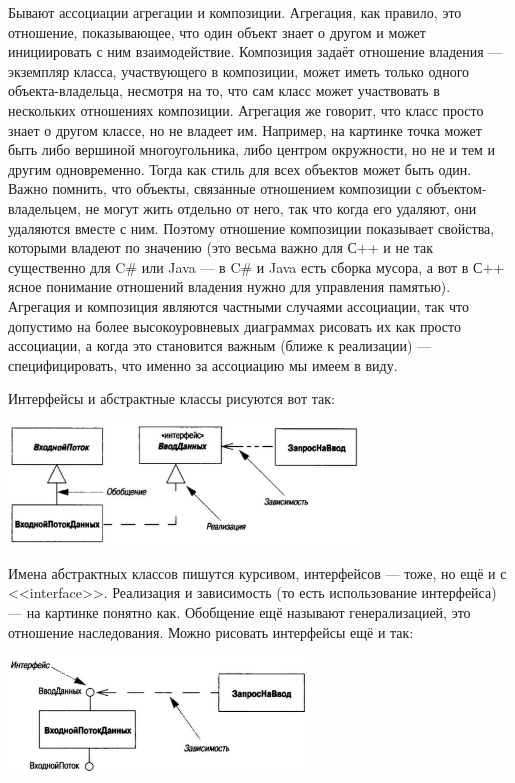 \documentclass[a5paper]{article}
\begin{document}
Бывают ассоциации агрегации и композиции. Агрегация, как правило, это отношение, показывающее, что один объект знает о другом и может инициировать с ним взаимодействие. Композиция задаёт отношение владения --- экземпляр класса, участвующего в композиции, может иметь только одного объекта-владельца, несмотря на то, что сам класс может участвовать в нескольких отношениях композиции. Агрегация же говорит, что класс просто знает о другом классе, но не владеет им. Например, на картинке точка может быть либо вершиной многоугольника, либо центром окружности, но не и тем и другим одновременно. Тогда как стиль для всех объектов может быть один. Важно помнить, что объекты,  связанные отношением композиции с объектом-владельцем, не могут жить отдельно от него, так что когда его удаляют, они удаляются вместе с ним. Поэтому отношение композиции показывает свойства, которыми владеют по значению (это весьма важно для С++ и не так существенно для C\# или Java --- в C\# и Java есть сборка мусора, а вот в С++ ясное понимание отношений владения нужно для управления памятью). Агрегация и композиция являются частными случаями ассоциации, так что допустимо на более высокоуровневых диаграммах рисовать их как просто ассоциации, а когда это становится важным (ближе к реализации) --- специфицировать, что именно за ассоциацию мы имеем в виду.

Интерфейсы и абстрактные классы рисуются вот так:

\begin{center}
	\includegraphics[width=0.7\textwidth]{interfaces1.png}
\end{center}

Имена абстрактных классов пишутся курсивом, интерфейсов --- тоже, но ещё и с <<interface>>. Реализация и зависимость (то есть использование интерфейса) --- на картинке понятно как. Обобщение ещё называют генерализацией, это отношение наследования. Можно рисовать интерфейсы ещё и так:

\begin{center}
	\includegraphics[width=0.6\textwidth]{interfaces2.png}
\end{center}
\end{document}
